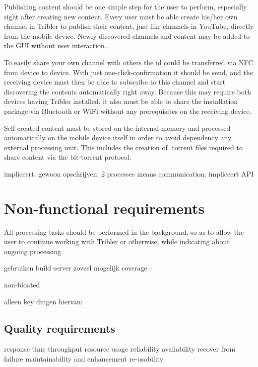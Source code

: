 Publishing content should be one simple step for the user to perform, especially right after creating new content.
Every user must be able create his/her own channel in Tribler to publish their content, just like channels in YouTube, directly from the mobile device.
Newly discovered channels and content may be added to the GUI without user interaction.

To easily share your own channel with others the id could be transferred via NFC from device to device.
With just one-click-confirmation it should be send, and the receiving device must then be able to subscribe to this channel and start discovering the contents automatically right away.
Because this may require both devices having Tribler installed, it also must be able to share the installation package via Bluetooth or WiFi without any prerequisites on the receiving device.

Self-created content must be stored on the internal memory and processed automatically on the mobile device itself in order to avoid dependency any external processing unit.
This includes the creation of .torrent files required to share content via the bit-torrent protocol.



impliceert: gewoon opschrijven: 2 processes means communication: impliceert API




\section{Non-functional requirements}

All processing tasks should be performed in the background, so as to allow the user to continue working with Tribler or otherwise, while indicating about ongoing processing.




gebruiken build server
zoveel mogelijk coverage

non-bloated

alleen key dingen hiervan:


\subsection{Quality requirements}

response time
throughput
resource usage
reliability
availability
recover from failure
maintainability and enhancement
re-usability

